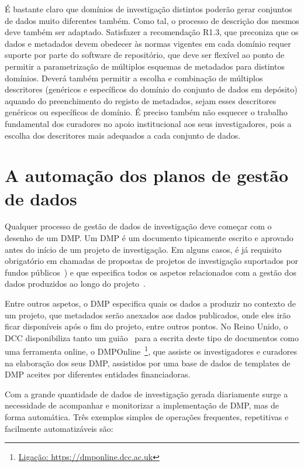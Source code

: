\documentclass[sigconf,nonacm]{acmart}
\begin{document}
É bastante claro que domínios de investigação distintos poderão gerar conjuntos de dados muito diferentes também. Como tal, o processo de descrição dos mesmos deve também ser adaptado. Satisfazer a recomendação R1.3, que preconiza que os dados e metadados devem obedecer às normas vigentes em cada domínio requer suporte por parte do software de repositório, que deve ser flexível ao ponto de permitir a parametrização de múltiplos esquemas de metadados para distintos domínios. Deverá também permitir a escolha e combinação de múltiplos descritores (genéricos e específicos do domínio do conjunto de dados em depósito) aquando do preenchimento do registo de metadados, sejam esses descritores genéricos ou específicos de domínio. É preciso também não esquecer o trabalho fundamental dos curadores no apoio institucional aos seus investigadores, pois a escolha dos descritores mais adequados a cada conjunto de dados.


\section{A automação dos planos de gestão de dados} %
\label{sec:a_automacao_dos_planos_de_gestao_de_dados}

Qualquer processo de gestão de dados de investigação deve começar com o desenho de um \gls{DMP}. Um \gls{DMP} é um documento tipicamente escrito e aprovado antes do início de um projeto de investigação. Em alguns casos, é já requisito obrigatório em chamadas de propostas de projetos de investigação suportados por fundos públicos~\cite{Foundation2011}) e que especifica todos os aspetos relacionados com a gestão dos dados produzidos ao longo do projeto~\cite{10.1371/journal.pcbi.1004525}.

Entre outros aspetos, o DMP especifica quais os dados a produzir no contexto de um projeto, que metadados serão anexados aos dados publicados, onde eles irão ficar disponíveis após o fim do projeto, entre outros pontos. No Reino Unido, o \gls{DCC} disponibiliza tanto um guião~\cite{jones_dmp} para a escrita deste tipo de documentos como uma ferramenta online, o DMPOnline~\footnote{\url{Ligação: https://dmponline.dcc.ac.uk}}, que assiste os investigadores e curadores na elaboração dos seus \gls{DMP}, assistidos por uma base de dados de templates de \gls{DMP} aceites por diferentes entidades financiadoras.

Com a grande quantidade de dados de investigação gerada diariamente surge a necessidade de acompanhar e monitorizar a implementação de \gls{DMP}, mas de forma automática. Três exemplos simples de operações frequentes, repetitivas e facilmente automatizáveis são:
\end{document}
